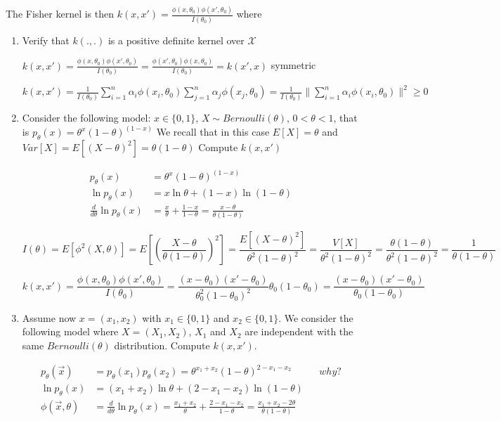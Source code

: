 \documentclass[11pt]{article}
\begin{document}
The Fisher kernel is then 
$k(x,x')=\frac{\phi(x,\theta_0)\phi(x',\theta_0)}{I(\theta_0)}$
where 
\begin{enumerate}
\item Verify that $k(.,.)$ is a positive definite kernel over $\mathcal{X}$

$k(x,x')=\frac{\phi(x,\theta_0)\phi(x',\theta_0)}{I(\theta_0)}=\frac{\phi(x',\theta_0)\phi(x,\theta_0)}{I(\theta_0)}=k(x',x)$ symmetric


$k(x,x')=\frac{1}{I(\theta_0)}\sum_{i=1}^n\alpha_i\phi(x_i,\theta_0)\sum_{j=1}^n\alpha_j\phi(x_j,\theta_0)=\frac{1}{I(\theta_0)}\|\sum_{i=1}^n\alpha_i\phi(x_i,\theta_0)\|^2\ge0$


\item Consider the following model: $x \in \{0,1\}$, $X \sim Bernoulli(\theta)$, $0 < \theta < 1$, that is
$p_\theta(x)=\theta^x(1-\theta)^{(1-x)}$
We recall that in this case $E[X]=\theta$ and $Var[X]=E[(X-\theta)^2]=\theta(1-\theta)$
Compute $k(x,x')$

\begin{align*}
p_\theta(x)&=\theta^x(1-\theta)^{(1-x)} \\
  \ln p_\theta(x)&=x\ln\theta+(1-x)\ln(1-\theta)\\
  \frac{d}{d \theta} \ln p_\theta(x)&=\frac{x}{\theta}+\frac{1-x}{1-\theta}=\frac{x-\theta}{\theta(1-\theta)}
\end{align*}

$$I(\theta)=E[\phi^2(X,\theta)]=E[(\frac{X-\theta}{\theta(1-\theta)})^2]
=\frac{E[(X-\theta)^2]}{\theta^2(1-\theta)^2}=\frac{V[X]}{\theta^2(1-\theta)^2}
=\frac{\theta(1-\theta)}{\theta^2(1-\theta)^2}=\frac{1}{\theta(1-\theta)}$$


$$k(x,x')=\frac{\phi(x,\theta_0)\phi(x',\theta_0)}{I(\theta_0)}=\frac{(x-\theta_0)(x'-\theta_0)}{\theta_0^2(1-\theta_0)^2}\theta_0(1-\theta_0)=\frac{(x-\theta_0)(x'-\theta_0)}{\theta_0(1-\theta_0)}$$

\item Assume now $x=(x_1,x_2)$ with $x_1 \in \{0,1\}$ and $x_2 \in \{0,1\}$. 
We consider the following model where $X=(X_1,X_2)$, $X_1$ and $X_2$ are independent with the same $Bernoulli(\theta)$ distribution. 
Compute $k(x,x')$. 

\begin{align*}
  p_\theta(\vec x)&=p_\theta(x_1)p_\theta(x_2)=\theta^{x_1+x_2}(1-\theta)^{2-x_1-x_2} && why?\\
  \ln p_\theta(x)&=(x_1+x_2)\ln\theta+(2-x_1-x_2)\ln(1-\theta)\\
  \phi(\vec x,\theta)&= \frac{d}{d \theta} \ln p_\theta(x)=\frac{x_1+x_2}{\theta}+\frac{2-x_1-x_2}{1-\theta}=\frac{x_1+x_2-2\theta}{\theta(1-\theta)}
\end{align*}


\end{enumerate}
\end{document}
